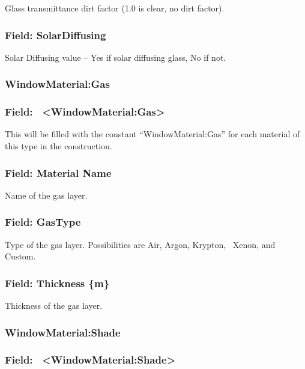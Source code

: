 Glass transmittance dirt factor (1.0 is clear, no dirt factor).

\subsubsection{Field: SolarDiffusing}\label{field-solardiffusing}

Solar Diffusing value -- Yes if solar diffusing glass, No if not.

\subsubsection{WindowMaterial:Gas}\label{materialwindowgas}

\subsubsection{Field:~ \textless{}WindowMaterial:Gas\textgreater{}}\label{field-materialwindowgas}

This will be filled with the constant ``WindowMaterial:Gas'' for each material of this type in the construction.

\subsubsection{Field: Material Name}\label{field-material-name-3}

Name of the gas layer.

\subsubsection{Field: GasType}\label{field-gastype}

Type of the gas layer. Possibilities are Air, Argon, Krypton,~ Xenon, and Custom.

\subsubsection{Field: Thickness \{m\}}\label{field-thickness-m-1}

Thickness of the gas layer.

\subsubsection{WindowMaterial:Shade}\label{materialwindowshade}

\subsubsection{Field:~ \textless{}WindowMaterial:Shade\textgreater{}}\label{field-materialwindowshade}

